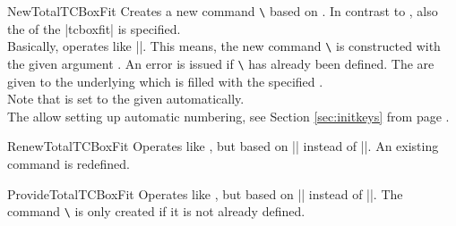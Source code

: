 \clearpage

\begin{docCommand}{NewTotalTCBoxFit}{}
  Creates a new command \texttt{\textbackslash} based on .
  In contrast to , also the  of the |tcboxfit| is specified.\\
  Basically,  operates like |\NewDocumentCommand|. This means,
  the new command \texttt{\textbackslash} is constructed with the given argument .
  An error is issued if \texttt{\textbackslash} has already been defined.
  The  are given to the underlying  which is filled with
  the specified .\\
  Note that  is set to the given 
  automatically.\\
  The  allow setting up automatic numbering,
  see Section \ref{sec:initkeys} from page \pageref{sec:initkeys}.

\end{docCommand}

\begin{docCommand}{RenewTotalTCBoxFit}{}
  Operates like , but based on |\RenewDocumentCommand| instead of |\NewDocumentCommand|.
  An existing command is redefined.
\end{docCommand}

\begin{docCommand}{ProvideTotalTCBoxFit}{}
  Operates like , but based on |\ProvideDocumentCommand| instead of |\NewDocumentCommand|.
  The command \texttt{\textbackslash} is only created if it is not already defined.
\end{docCommand}

